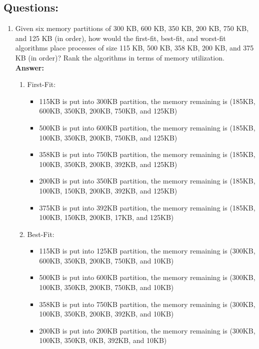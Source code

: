 \documentclass[a4paper, 11pt]{article}
\newcommand{\tf}{\textbf}
\begin{document}
\subsection{Questions: }

\begin{enumerate}
    \item Given six memory partitions of 300 KB, 600 KB, 350 KB, 200 KB, 750 KB, and 125 KB (in order), how would the first-fit, best-fit, and worst-fit algorithms place processes of size 115 KB, 500 KB, 358 KB, 200 KB, and 375 KB (in order)? Rank the algorithms in terms of memory utilization. \\
    
    \tf{Answer: } \\
    \begin{enumerate}
        \item First-Fit:
        \begin{itemize}
            \item 115KB is put into 300KB partition, the memory remaining is (185KB, 600KB, 350KB, 200KB, 750KB, and 125KB)
            \item 500KB is put into 600KB partition, the memory remaining is (185KB, 100KB, 350KB, 200KB, 750KB, and 125KB)
            \item 358KB is put into 750KB partition, the memory remaining is (185KB, 100KB, 350KB, 200KB, 392KB, and 125KB)
            \item 200KB is put into 350KB partition, the memory remaining is (185KB, 100KB, 150KB, 200KB, 392KB, and 125KB)
            \item 375KB is put into 392KB partition, the memory remaining is (185KB, 100KB, 150KB, 200KB, 17KB, and 125KB)
        \end{itemize}
        \item Best-Fit:
        \begin{itemize}
            \item 115KB is put into 125KB partition, the memory remaining is (300KB, 600KB, 350KB, 200KB, 750KB, and 10KB)
            \item 500KB is put into 600KB partition, the memory remaining is (300KB, 100KB, 350KB, 200KB, 750KB, and 10KB)
            \item 358KB is put into 750KB partition, the memory remaining is (300KB, 100KB, 350KB, 200KB, 392KB, and 10KB)
            \item 200KB is put into 200KB partition, the memory remaining is (300KB, 100KB, 350KB, 0KB, 392KB, and 10KB)

\end{itemize}
\end{enumerate}
\end{enumerate}
\end{document}
